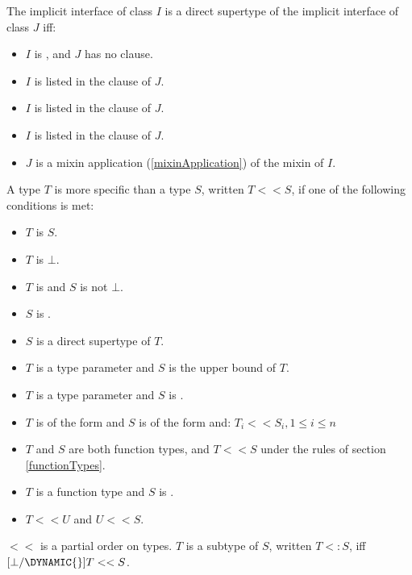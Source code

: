 \documentclass{article}
\begin{document}
\LMHash{}
The implicit interface of class $I$ is a direct supertype of the implicit interface of class $J$ if{}f:
\begin{itemize}
\item $I$ is , and $J$ has no \EXTENDS{} clause.
\item $I$ is listed in the \EXTENDS{} clause of $J$.
\item $I$ is listed in the \IMPLEMENTS{} clause of $J$.
\item $I$ is listed in the \WITH{} clause of $J$.
\item $J$ is a mixin application (\ref{mixinApplication}) of the mixin of $I$.
\end{itemize}

\LMHash{}
A type $T$ is more specific than a type $S$, written $T << S$, if one of the following conditions is met:
\begin{itemize}
\item $T$ is $S$.
\item $T$ is $\bot$.
\item $T$ is  and $S$ is not $\bot$.
\item $S$ is \DYNAMIC{}.
\item $S$ is a direct supertype of $T$.
\item $T$ is a type parameter and $S$ is the upper bound of $T$.
\item $T$ is a type parameter and $S$ is .
\item $T$ is of the form  and $S$ is of the form  and:
$T_i << S_i, 1 \le i \le n$
\item $T$ and $S$ are both function types, and $T << S$ under the rules of section \ref{functionTypes}.
\item $T$ is a function type and $S$ is \FUNCTION{}.
\item $T << U$ and $U << S$.
\end{itemize}

\LMHash{}
$<<$ is a partial order on types.
$T$ is a subtype of $S$, written $T <: S$, if{}f $[\bot/\DYNAMIC{}]T << S$.

\end{document}
